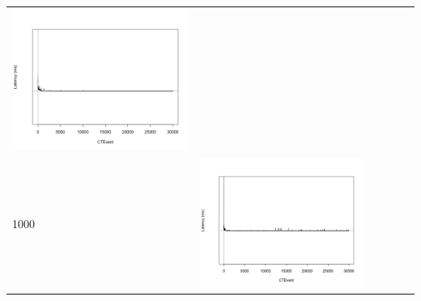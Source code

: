 \begin{table}[htbp]
{\begin{tabular}{l | ccccc}
\begin{minipage}{.15\textwidth}
				\vspace{2pt}
     			 	\includegraphics[width=\linewidth]{images/lat-log-graph/I10}
    				 \end{minipage}\\	
		1000   &	 \begin{minipage}{.15\textwidth}
     			 	
				\vspace{2pt}
     			 	\includegraphics[width=\linewidth]{images/lat-log-graph/I4}
    				 \end{minipage}
    			   &	 \begin{minipage}{.15\textwidth}
     			 	

\end{minipage}
\end{tabular}}
\end{table}
